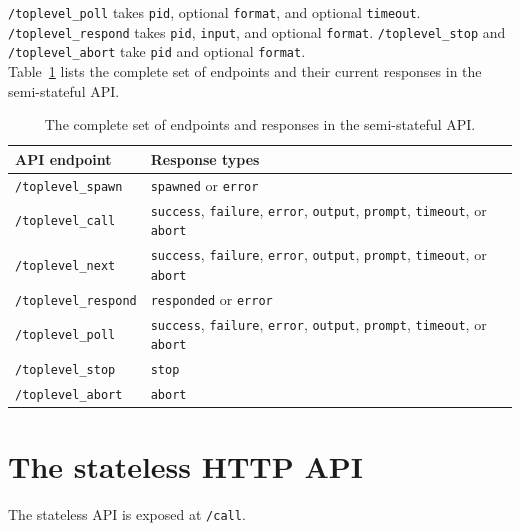 \medskip
\noindent \texttt{/toplevel\_poll} takes \texttt{pid}, optional
\texttt{format}, and optional \texttt{timeout}. \texttt{/toplevel\_respond}
takes \texttt{pid}, \texttt{input}, and optional \texttt{format}.
\texttt{/toplevel\_stop} and \texttt{/toplevel\_abort} take \texttt{pid} and
optional \texttt{format}.\\

\medskip
\noindent Table~\ref{table:semi-stateful-node-urls} lists the complete
set of endpoints and their current responses in the semi-stateful API.

\renewcommand{\arraystretch}{1.2}
\begin{table}[h]
\begin{center}
    \begin{tabular}{ | p{4cm} | p{6cm} |}
    \hline
    \textbf{API endpoint} &  \textbf{Response types} \\ \hline
    \texttt{/toplevel\_spawn} & \texttt{spawned} or \texttt{error} \\ \hline
    \texttt{/toplevel\_call} & \texttt{success}, \texttt{failure}, \texttt{error}, \texttt{output}, \texttt{prompt}, \texttt{timeout}, or \texttt{abort} \\ \hline
    \texttt{/toplevel\_next} & \texttt{success}, \texttt{failure}, \texttt{error}, \texttt{output}, \texttt{prompt}, \texttt{timeout}, or \texttt{abort} \\ \hline
    \texttt{/toplevel\_respond} & \texttt{responded} or \texttt{error} \\ \hline
    \texttt{/toplevel\_poll} & \texttt{success}, \texttt{failure}, \texttt{error}, \texttt{output}, \texttt{prompt}, \texttt{timeout}, or \texttt{abort} \\ \hline
    \texttt{/toplevel\_stop} & \texttt{stop} \\ \hline
    \texttt{/toplevel\_abort} & \texttt{abort} \\ \hline
\end{tabular}
\end{center}
\caption{The complete set of endpoints and responses in the semi-stateful API.}
\label{table:semi-stateful-node-urls}
\end{table}

\section{The stateless HTTP API}\label{sec:stateless-http-api}

\noindent The stateless API is exposed at \texttt{/call}.


